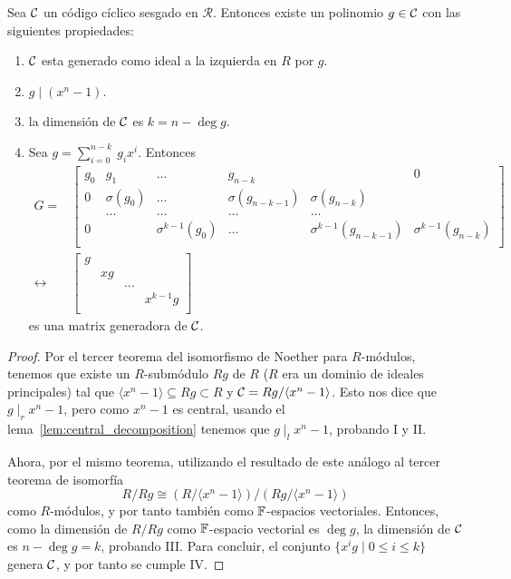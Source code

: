 \begin{theorem}
Sea \(\mathcal{C}\) un código cíclico sesgado en \(\mathcal{R}\). Entonces existe un polinomio \(g \in \mathcal{C}\) con las siguientes propiedades:

\begin{enumerate}[label=\roman*.]
    \item \(\mathcal{C}\) esta generado como ideal a la izquierda en \(R\) por \(g\).
    \item \(g \mid (x^{n} - 1) \).
    \item la dimensión de \(\mathcal{C}\) es \(k = n - \deg g \).
    \item
    Sea \(g = \sum_{i=0}^{n-k}\ g_i x^{i}\). Entonces
    \[
    \begin{aligned}
    G =&
    \begin{bmatrix}
        g_0 & g_1 & \ldots & g_{n-k} & & 0 \\
        0 & \sigma(g_0) & \ldots & \sigma(g_{n-k-1}) & \sigma(g_{n-k}) & \\
          & \ldots &  \ldots &  \ldots & \ldots &\\
        0 &  & \sigma^{k-1}(g_0) & \ldots & \sigma^{k-1}(g_{n-k-1}) & \sigma^{k-1}(g_{n-k}) \\
    \end{bmatrix} \\
    \leftrightarrow &
    \begin{bmatrix}
       g & & & \\
       & xg & & \\
       & & \ldots & \\
       & &  & x^{k-1}g \\
    \end{bmatrix}
    \end{aligned}
    \]
    es una matrix generadora de \(\mathcal{C}\).
\end{enumerate}
\end{theorem}

\begin{proof}
Por el tercer teorema del isomorfismo de Noether para \(R\)-módulos, tenemos que existe un \(R\)-submódulo \(Rg\) de \(R\) (\(R\) era un dominio de ideales principales) tal que \(\langle x^{n} - 1 \rangle \subseteq Rg \subset R\) y \(\mathcal{C} = Rg / \langle x^{n} - 1 \rangle\). Esto nos dice que \(g \mid_r x^{n} -1\), pero como \(x^{n} - 1\) es central, usando el lema~\ref{lem:central_decomposition} tenemos que \(g  \mid_l x^{n} - 1\), probando I y II.

Ahora, por el mismo teorema, utilizando el resultado de este análogo al tercer teorema de isomorfía
\[
R / Rg \cong (R / \langle x^{n} -1 \rangle) / (Rg / \langle x^{n} -1 \rangle)
\]
como \(R\)-módulos, y por tanto también como  \(\mathbb{F}\)-espacios vectoriales. Entonces, como la dimensión de \(R / Rg\) como  \(\mathbb{F}\)-espacio vectorial es \(\deg g\), la dimensión de \(\mathcal{C}\) es \(n - \deg g = k\), probando III. Para concluir, el conjunto \(\{x^{i}g \mid 0 \le i \le k\}\) genera \(\mathcal{C}\), y por tanto se cumple IV.
\end{proof}

